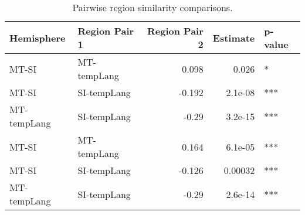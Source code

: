 \begin{table}[h]
\centering
\begin{tabular}{llrrl}
\toprule
 Hemisphere   & Region Pair 1   &   Region Pair 2 &   Estimate & p-value   \\
\midrule
 MT-SI        & MT-tempLang     &           0.098 &    0.026   & *         \\
 MT-SI        & SI-tempLang     &          -0.192 &    2.1e-08 & ***       \\
 MT-tempLang  & SI-tempLang     &          -0.29  &    3.2e-15 & ***       \\
 MT-SI        & MT-tempLang     &           0.164 &    6.1e-05 & ***       \\
 MT-SI        & SI-tempLang     &          -0.126 &    0.00032 & ***       \\
 MT-tempLang  & SI-tempLang     &          -0.29  &    2.6e-14 & ***       \\
\bottomrule
\end{tabular}
\caption{Pairwise region similarity comparisons.}
\end{table}